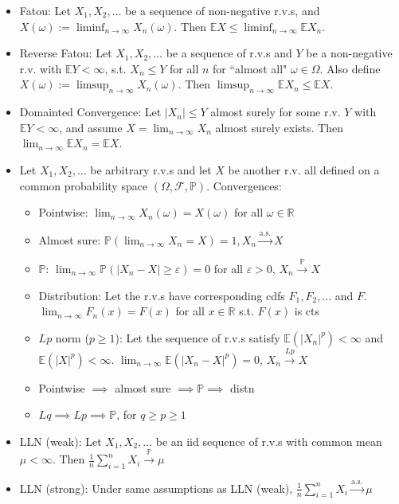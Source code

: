 \begin{itemize}
    \item Fatou: Let $X_1, X_2, \dots$ be a sequence of non-negative r.v.s, and $\displaystyle X(\omega) := \liminf_{n\to\infty} X_n(\omega)$. Then $\displaystyle\mathbb{E}X \leq \liminf_{n\to\infty} \mathbb{E}X_n$.
    \item Reverse Fatou: Let $X_1, X_2, \dots$ be a sequence of r.v.s and $Y$ be a non-negative r.v. with $\mathbb{E}Y < \infty$, s.t. $X_n \leq Y$ for all $n$ for ``almost all" $\omega\in\Omega$. Also define $\displaystyle X(\omega) := \limsup_{n\to\infty} X_n(\omega)$. Then $\limsup_{n\to\infty} \mathbb{E}X_n \leq \mathbb{E}X$.
    \item Domainted Convergence: Let $|X_n| \leq Y$ almost surely for some r.v. $Y$ with $\mathbb{E}Y < \infty$, and assume $X = \lim_{n\to\infty} X_n$ almost surely exists. Then $\lim_{n\to\infty} \mathbb{E}X_n = \mathbb{E}X$.
    \item Let $X_1, X_2, \dots$ be arbitrary r.v.s and let $X$ be another r.v. all defined on a common probability space $(\Omega, \mathcal{F}, \mathbb{P})$. Convergences:
    \begin{itemize}
        \item Pointwise: $\lim_{n\to\infty} X_n(\omega) = X(\omega)$ for all $\omega \in \mathbb{R}$
        \item Almost sure: $\mathbb{P}(\lim_{n\to\infty}X_n = X) = 1, X_n \stackrel{\text{a.s.}}{\to}X$
        \item $\mathbb{P}$: $\lim_{n\to\infty} \mathbb{P}(|X_n - X| \geq \varepsilon) = 0$ for all $\varepsilon > 0$, $X_n \stackrel{\mathbb{P}}{\to} X$
        \item Distribution: Let the r.v.s have corresponding cdfs $F_1, F_2, \dots$ and $F$. $\lim_{n\to\infty} F_n(x) = F(x)$ for all $x \in \mathbb{R}$ s.t. $F(x)$ is cts
        \item $Lp$ norm ($p \geq 1$): Let the sequence of r.v.s satisfy $\mathbb{E}(|X_n|^p) < \infty$ and $\mathbb{E}(|X|^p) < \infty$. $\lim_{n\to\infty} \mathbb{E}(|X_n - X|^p) = 0$, $X_n \stackrel{Lp}{\to} X$
        \item Pointwise $\implies$ almost sure $\implies \mathbb{P} \implies$ distn
        \item $Lq \implies Lp \implies \mathbb{P}$, for $q \geq p \geq 1$
    \end{itemize}
    \item LLN (weak): Let $X_1, X_2, \dots$ be an iid sequence of r.v.s with common mean $\mu < \infty$. Then $\frac{1}{n}\sum_{i=1}^n X_i \stackrel{\mathbb{P}}{\to} \mu$
    \item LLN (strong): Under same assumptions as LLN (weak), $\frac{1}{n}\sum_{i=1}^n X_i \stackrel{\text{a.s.}}{\to} \mu$
\end{itemize}



